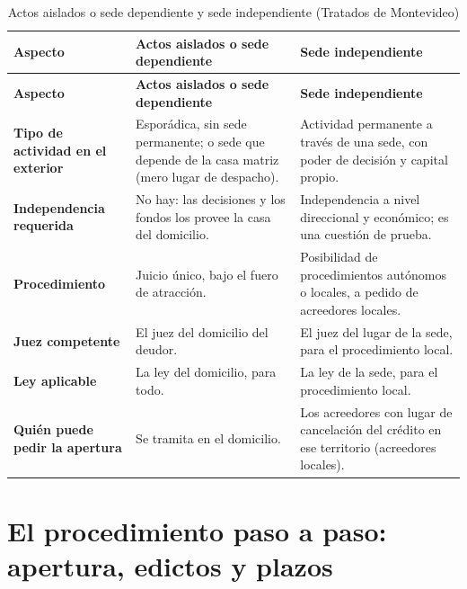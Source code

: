 \documentclass[12pt,oneside]{book}
\begin{document}
\begin{longtable}{>{\raggedright\arraybackslash}p{} >{\raggedright\arraybackslash}p{} >{\raggedright\arraybackslash}p{}}
\caption{Actos aislados o sede dependiente y sede independiente (Tratados de Montevideo)}\\
\toprule
\textbf{Aspecto} & \textbf{Actos aislados o sede dependiente} & \textbf{Sede independiente} \\
\midrule
\endfirsthead
\toprule
\textbf{Aspecto} & \textbf{Actos aislados o sede dependiente} & \textbf{Sede independiente} \\
\midrule
\endhead
\bottomrule
\endlastfoot
\textbf{Tipo de actividad en el exterior} & Esporádica, sin sede permanente; o sede que depende de la casa matriz (mero lugar de despacho). & Actividad permanente a través de una sede, con poder de decisión y capital propio. \\
\textbf{Independencia requerida} & No hay: las decisiones y los fondos los provee la casa del domicilio. & Independencia a nivel direccional y económico; es una cuestión de prueba. \\
\textbf{Procedimiento} & Juicio único, bajo el fuero de atracción. & Posibilidad de procedimientos autónomos o locales, a pedido de acreedores locales. \\
\textbf{Juez competente} & El juez del domicilio del deudor. & El juez del lugar de la sede, para el procedimiento local. \\
\textbf{Ley aplicable} & La ley del domicilio, para todo. & La ley de la sede, para el procedimiento local. \\
\textbf{Quién puede pedir la apertura} & Se tramita en el domicilio. & Los acreedores con lugar de cancelación del crédito en ese territorio (acreedores locales). \\
\end{longtable}

\section{El procedimiento paso a paso: apertura, edictos y plazos}
\end{document}
